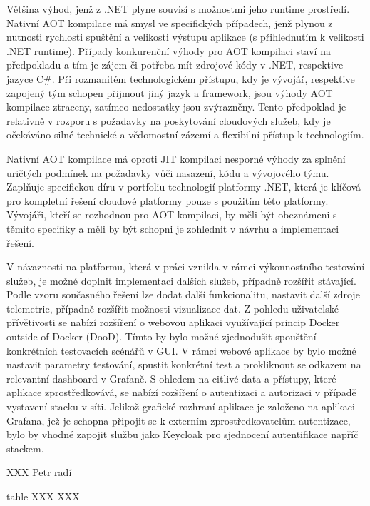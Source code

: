 Většina výhod, jenž z .NET plyne souvisí s možnostmi jeho runtime prostředí. Nativní AOT kompilace má smysl ve specifických případech, jenž plynou z nutnosti rychlosti spuštění a velikosti výstupu aplikace (s přihlednutím k velikosti .NET runtime). Případy konkurenční výhody pro AOT kompilaci staví na předpokladu a tím je zájem či potřeba mít zdrojové kódy v .NET, respektive jazyce C\#. Při rozmanitém technologickém přístupu, kdy je vývojář, respektive zapojený tým schopen přijmout jiný jazyk a framework, jsou výhody AOT kompilace ztraceny, zatímco nedostatky jsou zvýrazněny. Tento předpoklad je relativně v rozporu s požadavky na poskytování cloudových služeb, kdy je očekáváno silné technické a vědomostní zázemí a flexibilní přístup k technologiím.

Nativní AOT kompilace má oproti JIT kompilaci nesporné výhody za splnění uričtých podmínek na požadavky vůči nasazení, kódu a vývojového týmu. Zaplňuje specifickou díru v portfoliu technologií platformy .NET, která je klíčová pro kompletní řešení cloudové platformy pouze s použitím této platformy. Vývojáři, kteří se rozhodnou pro AOT kompilaci, by měli být obeznámeni s těmito specifiky a měli by být schopni je zohlednit v návrhu a implementaci řešení.

V návaznosti na platformu, která v práci vznikla v rámci výkonnostního testování služeb, je možné doplnit implementaci dalších služeb, případně rozšířit stávající. Podle vzoru současného řešení lze dodat další funkcionalitu, nastavit další zdroje telemetrie, případně rozšířit možnosti vizualizace dat. Z pohledu uživatelské přívětivosti se nabízí rozšíření o webovou aplikaci využívající princip Docker outside of Docker (DooD). Tímto by bylo možné zjednodušit spouštění konkrétních testovacích scénářů v GUI. V rámci webové aplikace by bylo možné nastavit parametry testování, spustit konkrétní test a prokliknout se odkazem na relevantní dashboard v Grafaně. S ohledem na citlivé data a přístupy, které aplikace zprostředkovává, se nabízí rozšíření o autentizaci a autorizaci v případě vystavení stacku v síti. Jelikož grafické rozhraní aplikace je založeno na aplikaci Grafana, jež je schopna připojit se k externím zprostředkovatelům autentizace, bylo by vhodné zapojit službu jako Keycloak pro sjednocení autentifikace napříč stackem.


XXX Petr radí


tahle XXX XXX

